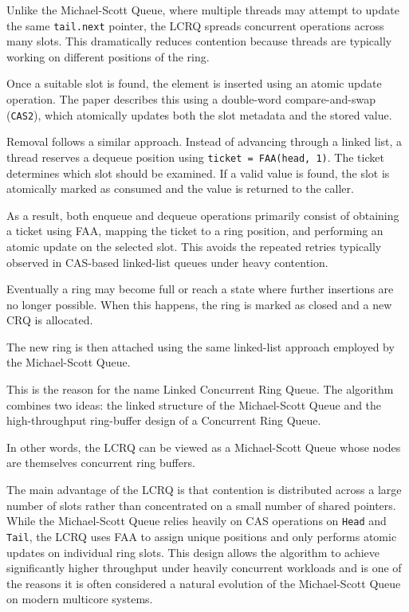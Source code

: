 
Unlike the Michael-Scott Queue, where multiple threads may attempt to update the same \texttt{tail.next} pointer, the LCRQ spreads concurrent operations across many slots. This dramatically reduces contention because threads are typically working on different positions of the ring. \cite{lcrq}

Once a suitable slot is found, the element is inserted using an atomic update operation. The paper describes this using a double-word compare-and-swap (\texttt{CAS2}), which atomically updates both the slot metadata and the stored value. \cite{lcrq}

Removal follows a similar approach. Instead of advancing through a linked list, a thread reserves a dequeue position using \texttt{ticket = FAA(head, 1)}. The ticket determines which slot should be examined. If a valid value is found, the slot is atomically marked as consumed and the value is returned to the caller. \cite{lcrq}

As a result, both enqueue and dequeue operations primarily consist of obtaining a ticket using FAA, mapping the ticket to a ring position, and performing an atomic update on the selected slot. This avoids the repeated retries typically observed in CAS-based linked-list queues under heavy contention. \cite{lcrq}

Eventually a ring may become full or reach a state where further insertions are no longer possible. When this happens, the ring is marked as closed and a new CRQ is allocated. \cite{lcrq}

The new ring is then attached using the same linked-list approach employed by the Michael-Scott Queue. \cite{lcrq}


This is the reason for the name Linked Concurrent Ring Queue. The algorithm combines two ideas: the linked structure of the Michael-Scott Queue and the high-throughput ring-buffer design of a Concurrent Ring Queue. \cite{lcrq}

In other words, the LCRQ can be viewed as a Michael-Scott Queue whose nodes are themselves concurrent ring buffers. \cite{lcrq}

The main advantage of the LCRQ is that contention is distributed across a large number of slots rather than concentrated on a small number of shared pointers. While the Michael-Scott Queue relies heavily on CAS operations on \texttt{Head} and \texttt{Tail}, the LCRQ uses FAA to assign unique positions and only performs atomic updates on individual ring slots. This design allows the algorithm to achieve significantly higher throughput under heavily concurrent workloads and is one of the reasons it is often considered a natural evolution of the Michael-Scott Queue on modern multicore systems.
